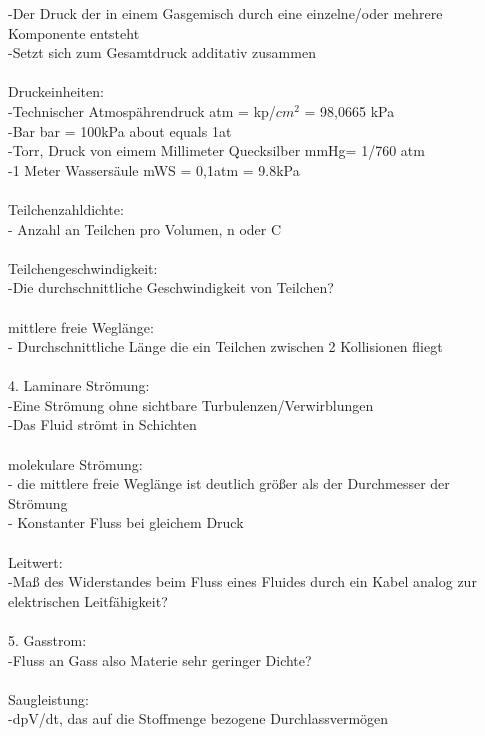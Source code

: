 	   	-Der Druck der in einem Gasgemisch durch eine einzelne/oder mehrere Komponente entsteht\\
		-Setzt sich zum Gesamtdruck additativ zusammen\\
\\
	   Druckeinheiten:\\
	   	-Technischer Atmospährendruck atm = kp/$cm^2$ = 98,0665 kPa \\
		-Bar bar = 100kPa about equals 1at\\
		-Torr, Druck von eimem Millimeter Quecksilber mmHg= 1/760 atm\\
		-1 Meter Wassersäule mWS = 0,1atm = 9.8kPa\\
\\
	   Teilchenzahldichte:\\
	   	- Anzahl an Teilchen pro Volumen, n oder C\\
\\
	   Teilchengeschwindigkeit:\\
		-Die durchschnittliche Geschwindigkeit von Teilchen?\\
\\
	   mittlere freie Weglänge:\\
	   	- Durchschnittliche Länge die ein Teilchen zwischen 2 Kollisionen fliegt\\
\\
	4. Laminare Strömung:\\
		-Eine Strömung ohne sichtbare Turbulenzen/Verwirblungen\\
		-Das Fluid strömt in Schichten\\
\\
	   molekulare Strömung:\\
		- die mittlere freie Weglänge ist deutlich größer als der Durchmesser der Strömung\\
		- Konstanter Fluss bei gleichem Druck\\
\\
	   Leitwert:\\
		-Maß des Widerstandes beim Fluss eines Fluides durch ein Kabel analog zur elektrischen Leitfähigkeit?\\ 
\\
	5. Gasstrom: \\
		-Fluss an Gass also Materie sehr geringer Dichte?\\
\\
	   Saugleistung:\\
		-dpV/dt, das auf die Stoffmenge bezogene Durchlassvermögen\\
